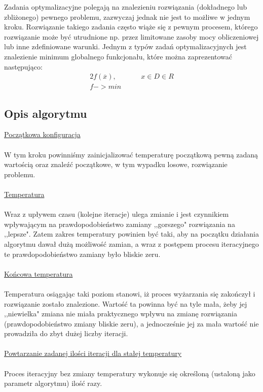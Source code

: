 \documentclass[twoside]{projektInzynierskiMS1}
\newcommand{\newLine}{~\\}
\newcommand{\si}{ś}
\begin{document}
Zadania optymalizacyjne polegają na znalezieniu rozwiązania (dokładnego lub zbliżonego) pewnego problemu, zazwyczaj jednak nie jest to możliwe w jednym kroku. Rozwiązanie takiego zadania często wiąże się z pewnym procesem, którego rozwiązanie może być utrudnione np. przez limitowane zasoby mocy obliczeniowej lub inne zdefiniowane warunki. Jednym z typów zadań optymalizacyjnych jest znalezienie minimum globalnego funkcjonału, które można zaprezentować następująco: \\

\begin{alignat*}{2}
f(\overline{x}),&\qquad  x \in D \in R\\
f -> min
\end{alignat*}

		\subsection{Opis algorytmu}
		
\noindent \underline{Początkowa konfiguracja} \\ \newLine
\indent W tym kroku powinniśmy zainicjalizować temperaturę początkową pewną zadaną wartością oraz znaleźć początkowe, w tym wypadku losowe, rozwiązanie problemu. 
\\ \newLine

\noindent \underline{Temperatura} \\ \newLine
\indent  Wraz z upływem czasu (kolejne iteracje) ulega zmianie i jest czynnikiem wpływającym na prawdopodobieństwo zamiany ,,gorszego" rozwiązania na ,,lepsze". Zatem zakres temperatury powinien być taki, aby na początku działania algorytmu dawał dużą możliwość zamian, a wraz z postępem procesu iteracyjnego te prawdopodobieństwo zamiany było bliskie zeru.\\ \newLine

\noindent \underline{Końcowa temperatura} \\ \newLine
\indent Temperatura osiągając taki poziom stanowi, iż proces wyżarzania się zakończył i rozwiązanie zostało znalezione.
Wartość ta powinna być na tyle mała, żeby jej ,,niewielka" zmiana nie miała praktycznego wpływu na zmianę rozwiązania (prawdopodobieństwo zmiany bliskie zeru), a jednocze\si nie jej za mała warto\si ć nie prowadziła do zbyt dużej liczby iteracji. \\ \newLine

\noindent \underline{Powtarzanie zadanej ilo\si ci iteracji dla stałej temperatury} \\ \newLine
Proces iteracyjny bez zmiany temperatury wykonuje się okre\si loną (ustaloną jako parametr algorytmu) ilo\si ć razy. \\ \newLine
\end{document}
